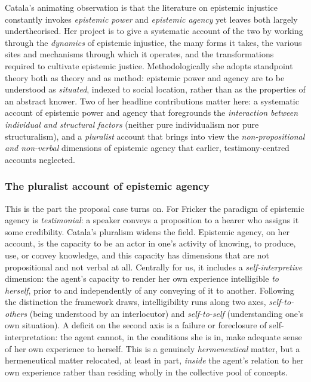 \documentclass[11pt,a4paper]{article}
\begin{document}
Catala's animating observation is that the literature on epistemic injustice constantly invokes \emph{epistemic power} and \emph{epistemic agency} yet leaves both largely undertheorised. Her project is to give a systematic account of the two by working through the \emph{dynamics} of epistemic injustice, the many forms it takes, the various sites and mechanisms through which it operates, and the transformations required to cultivate epistemic justice. Methodologically she adopts standpoint theory both as theory and as method: epistemic power and agency are to be understood as \emph{situated}, indexed to social location, rather than as the properties of an abstract knower. Two of her headline contributions matter here: a systematic account of epistemic power and agency that foregrounds the \emph{interaction between individual and structural factors} (neither pure individualism nor pure structuralism), and a \emph{pluralist} account that brings into view the \emph{non-propositional and non-verbal} dimensions of epistemic agency that earlier, testimony-centred accounts neglected.

\subsubsection{The pluralist account of epistemic agency}

This is the part the proposal case turns on. For Fricker the paradigm of epistemic agency is \emph{testimonial}: a speaker conveys a proposition to a hearer who assigns it some credibility. Catala's pluralism widens the field. Epistemic agency, on her account, is the capacity to be an actor in one's activity of knowing, to produce, use, or convey knowledge, and this capacity has dimensions that are not propositional and not verbal at all. Centrally for us, it includes a \emph{self-interpretive} dimension: the agent's capacity to render her own experience intelligible \emph{to herself}, prior to and independently of any conveying of it to another. Following the distinction the framework draws, intelligibility runs along two axes, \emph{self-to-others} (being understood by an interlocutor) and \emph{self-to-self} (understanding one's own situation). A deficit on the second axis is a failure or foreclosure of self-interpretation: the agent cannot, in the conditions she is in, make adequate sense of her own experience to herself. This is a genuinely \emph{hermeneutical} matter, but a hermeneutical matter relocated, at least in part, \emph{inside} the agent's relation to her own experience rather than residing wholly in the collective pool of concepts.
\end{document}

